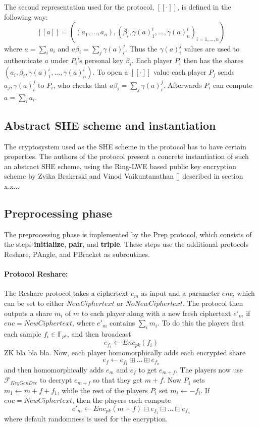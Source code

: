 \documentclass{article}
\begin{document}
The second representation used for the protocol, $[\![ \cdot ]\!]$, is defined in the following way:
$$[\![ a ]\!] = ((a_1, ..., a_n), (\beta_i, \gamma(a)^i_1, ..., \gamma(a)^i_n)_{i = 1, ..., n})$$
where $a = \sum_i a_i$ and $a\beta_i = \sum_j \gamma(a)^j_i$. Thus the $\gamma(a)^j_i$ values are used to authenticate $a$ under $P_i$'s personal key $\beta_i$. Each player $P_i$ then has the shares $(a_i, \beta_i, \gamma(a)^i_1, ..., \gamma(a)^i_n)$. To open a $[\![ \cdot ]\!]$ value each player $P_j$ sends $a_j, \gamma(a)^j_i$ to $P_i$, who checks that $a\beta_i = \sum_j \gamma(a)^j_i$. Afterwards $P_i$ can compute $a = \sum_i a_i$.

\subsection{Abstract SHE scheme and instantiation}
The cryptosystem used as the SHE scheme in the protocol has to have certain properties. The authors of the protocol present a concrete instantiation of such an abstract SHE scheme, using the Ring-LWE based public key encryption scheme by Zvika Brakerski and Vinod Vaikuntanathan [] described in section x.x...

\subsection{Preprocessing phase} \label{Prep}
The preprocessing phase is implemented by the Prep protocol, which consists of the steps \textbf{initialize}, \textbf{pair}, and \textbf{triple}. These steps use the additional protocols Reshare, PAngle, and PBracket as subroutines.

\paragraph{Protocol Reshare:} The Reshare protocol takes a ciphertext $e_m$ as input and a parameter $enc$, which can be set to either $NewCiphertext$ or $NoNewCiphertext$. The protocol then outputs a share $m_i$ of $m$ to each player along with a new fresh ciphertext $e'_m$ if $enc = NewCiphertext$, where $e'_m$ contains $\sum_i m_i$.
To do this the players first each sample $f_i \in \mathbb{F}_{p^k}$, and then broadcast $$e_{f_i} \leftarrow Enc_{pk}(f_i)$$ ZK bla bla bla.
Now, each player homomorphically adds each encrypted share
$$e_f \leftarrow e_{f_1} \boxplus ... \boxplus e_{f_n} $$
 and then homomorphically adds $e_m$ and $e_f$ to get $e_{m + f}$. The players now use $\mathcal{F}_{KeyGenDec}$ to decrypt $e_{m + f}$ so that they get $m + f$. Now $P_1$ sets $m_1 \leftarrow m + f + f_1$, while the rest of the players $P_i$ set $m_i \leftarrow - f_i$.
If $enc = NewCiphertext$, then the players each compute
$$e'_m \leftarrow Enc_{pk}(m + f) \boxminus e_{f_1} \boxminus ... \boxminus e_{f_n}$$ where default randomness is used for the encryption.
\end{document}
